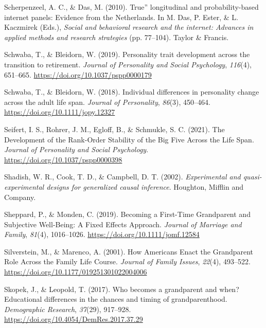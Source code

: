 \documentclass[
  english,
  man, noextraspace]{apa7}
\begin{document}
\leavevmode\hypertarget{ref-scherpenzeelTrueLongitudinalProbabilitybased2010}{}%
Scherpenzeel, A. C., \& Das, M. (2010). True'' longitudinal and probability-based internet panels: Evidence from the Netherlands. In M. Das, P. Ester, \& L. Kaczmirek (Eds.), \emph{Social and behavioral research and the internet: Advances in applied methods and research strategies} (pp. 77--104). Taylor \& Francis.

\leavevmode\hypertarget{ref-schwabaPersonalityTraitDevelopment2019}{}%
Schwaba, T., \& Bleidorn, W. (2019). Personality trait development across the transition to retirement. \emph{Journal of Personality and Social Psychology}, \emph{116}(4), 651--665. \url{https://doi.org/10.1037/pspp0000179}

\leavevmode\hypertarget{ref-schwabaIndividualDifferencesPersonality2018}{}%
Schwaba, T., \& Bleidorn, W. (2018). Individual differences in personality change across the adult life span. \emph{Journal of Personality}, \emph{86}(3), 450--464. \url{https://doi.org/10.1111/jopy.12327}

\leavevmode\hypertarget{ref-seifertDevelopmentRankOrderStability2021}{}%
Seifert, I. S., Rohrer, J. M., Egloff, B., \& Schmukle, S. C. (2021). The Development of the Rank-Order Stability of the Big Five Across the Life Span. \emph{Journal of Personality and Social Psychology}. \url{https://doi.org/10.1037/pspp0000398}

\leavevmode\hypertarget{ref-shadishExperimentalQuasiexperimentalDesigns2002}{}%
Shadish, W. R., Cook, T. D., \& Campbell, D. T. (2002). \emph{Experimental and quasi-experimental designs for generalized causal inference}. Houghton, Mifflin and Company.

\leavevmode\hypertarget{ref-sheppardBecomingFirstTimeGrandparent2019}{}%
Sheppard, P., \& Monden, C. (2019). Becoming a First-Time Grandparent and Subjective Well-Being: A Fixed Effects Approach. \emph{Journal of Marriage and Family}, \emph{81}(4), 1016--1026. \url{https://doi.org/10.1111/jomf.12584}

\leavevmode\hypertarget{ref-silversteinHowAmericansEnact2001}{}%
Silverstein, M., \& Marenco, A. (2001). How Americans Enact the Grandparent Role Across the Family Life Course. \emph{Journal of Family Issues}, \emph{22}(4), 493--522. \url{https://doi.org/10.1177/019251301022004006}

\leavevmode\hypertarget{ref-skopekWhoBecomesGrandparent2017}{}%
Skopek, J., \& Leopold, T. (2017). Who becomes a grandparent and when? Educational differences in the chances and timing of grandparenthood. \emph{Demographic Research}, \emph{37}(29), 917--928. \url{https://doi.org/10.4054/DemRes.2017.37.29}
\end{document}
